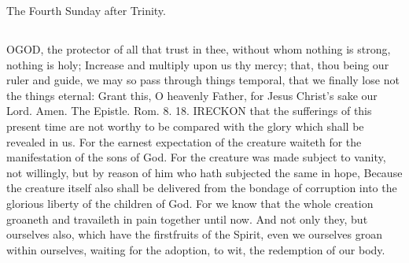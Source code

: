 The Fourth Sunday after Trinity.
\subsection{}
OGOD, the protector of all that trust in thee, without whom nothing is strong, nothing is holy; Increase and multiply upon us thy mercy; that, thou being our ruler and guide, we may so pass through things temporal, that we finally lose not the things eternal: Grant this, O heavenly Father, for Jesus Christ's sake our Lord. Amen.
The Epistle. Rom. 8. 18.
IRECKON that the sufferings of this present time are not worthy to be compared with the glory which shall be revealed in us. For the earnest expectation of the creature waiteth for the manifestation of the sons of God. For the creature was made subject to vanity, not willingly, but by reason of him who hath subjected the same in hope, Because the creature itself also shall be delivered from the bondage of corruption into the glorious liberty of the children of God. For we know that the whole creation groaneth and travaileth in pain together until now. And not only they, but ourselves also, which have the firstfruits of the Spirit, even we ourselves groan within ourselves, waiting for the adoption, to wit, the redemption of our body.

\subsection{}


